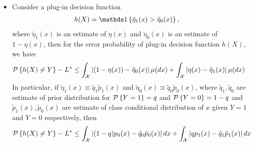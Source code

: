 \documentclass[11pt]{article}
\begin{document}
\begin{itemize}
\item  \begin{corollary}
Consider a plug-in decision function 
\begin{align*}
h(X) &= \ind{\tilde{\eta}_{1}(x)>\tilde{\eta}_{0}(x)},
\end{align*}
where $\tilde{\eta}_{1}(x)$ is an estimate of $\eta(x)$ and $\tilde{\eta}_{0}(x)$ is an estimate of $1-\eta(x)$, then for the error probability of plug-in decision function  $h(X)$, we have
\begin{align}
{\mathcal P}\left\{h(X)\neq Y\right\} - L^{*} &\le \int_{{\mathcal X}}\left\lvert (1- \eta(x))- \tilde{\eta}_{0}(x) \right\rvert\mu(dx)+ \int_{{\mathcal X}}\left\lvert \eta(x)- \tilde{\eta}_{1}(x) \right\rvert\mu(dx)
\end{align}
In particular, if $\tilde{\eta}_{1}(x) \equiv \tilde{q}_{1}\tilde{p}_{1}(x)$ and $\tilde{\eta}_{0}(x)\equiv \tilde{q}_{0}\tilde{p}_{0}(x)$, where $\tilde{q}_{1}, \tilde{q}_{0}$ are estimate of prior distribution for ${\mathcal P}\left\{Y=1\right\}=q$ and ${\mathcal P}\left\{Y=0\right\}=1-q$ and $\tilde{p}_{1}(x), \tilde{p}_{0}(x)$ are estimate of class conditional distribution of $x$ given $Y=1$ and $Y=0$ respectively, then 
\begin{align*}
{\mathcal P}\left\{h(X)\neq Y\right\} - L^{*} &\le \int_{{\mathcal X}}\left\lvert (1- q)p_{0}(x)- \tilde{q}_{0}\tilde{p}_{0}(x) \right\rvert dx+ \int_{{\mathcal X}}\left\lvert qp_{1}(x)- \tilde{q}_{1}\tilde{p}_{1}(x) \right\rvert dx
\end{align*}
\end{corollary}




\end{itemize}
\end{document}

